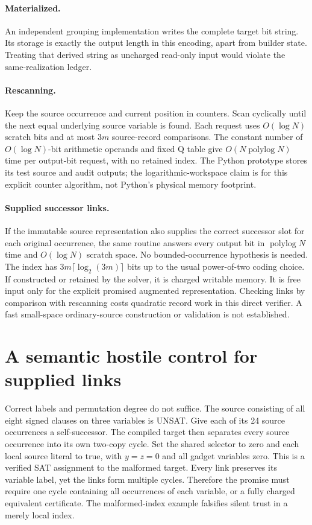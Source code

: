 \documentclass[11pt]{article}
\begin{document}
\paragraph{Materialized.}
An independent grouping implementation writes the complete target bit string.
Its storage is exactly the output length in this encoding, apart from
builder state. Treating that derived string as uncharged read-only input
would violate the same-realization ledger.

\paragraph{Rescanning.}
Keep the source occurrence and current position in counters. Scan cyclically
until the next equal underlying source variable is found. Each request uses
$O(\log N)$ scratch bits and at most $3m$ source-record comparisons.
The constant number of $O(\log N)$-bit arithmetic operands and fixed Q table
give $O(N\operatorname{polylog}N)$ time per output-bit request, with no
retained index. The Python prototype stores its test source and audit outputs;
the logarithmic-workspace claim is for this explicit counter algorithm,
not Python's physical memory footprint.

\paragraph{Supplied successor links.}
If the immutable source representation also supplies the correct successor
slot for each original occurrence, the same routine answers every output
bit in $\operatorname{polylog}N$ time and $O(\log N)$ scratch space.
No bounded-occurrence hypothesis is needed. The index has
$3m\lceil\log_2(3m)\rceil$ bits up to the usual power-of-two coding choice.
If constructed or retained by the solver, it is charged writable memory.
It is free input only for the explicit promised augmented representation.
Checking links by comparison with rescanning costs quadratic record work
in this direct verifier. A fast small-space ordinary-source construction
or validation is not established.

\section{A semantic hostile control for supplied links}
Correct labels and permutation degree do not suffice.
The source consisting of all eight signed clauses on three variables is
UNSAT. Give each of its 24 source occurrences a self-successor.
The compiled target then separates every source occurrence into its own
two-copy cycle. Set the shared selector to zero and each local source
literal to true, with $y=z=0$ and all gadget variables zero.
This is a verified SAT assignment to the malformed target.
Every link preserves its variable label, yet the links form multiple cycles.
Therefore the promise must require one cycle containing all occurrences
of each variable, or a fully charged equivalent certificate.
The malformed-index example falsifies silent trust in a merely local index.
\end{document}
